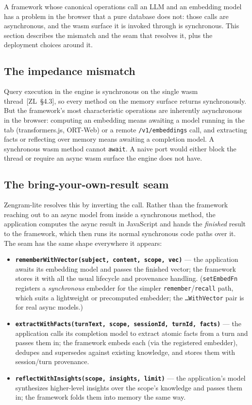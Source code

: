 \documentclass[11pt]{article}
\newcommand{\code}[1]{\texttt{#1}}
\begin{document}
A framework whose canonical operations call an LLM and an embedding model has a
problem in the browser that a pure database does not: those calls are
asynchronous, and the wasm surface it is invoked through is synchronous. This
section describes the mismatch and the seam that resolves it, plus the deployment
choices around it.

\subsection{The impedance mismatch}

Query execution in the engine is synchronous on the single wasm thread~[ZL~\S4.3],
so every method on the memory surface returns synchronously. But the framework's
most characteristic operations are inherently asynchronous in the browser:
computing an embedding means awaiting a model running in the tab (transformers.js,
ORT-Web) or a remote \code{/v1/embeddings} call, and extracting facts or
reflecting over memory means awaiting a completion model. A synchronous wasm
method cannot \code{await}. A naive port would either block the thread or require
an async wasm surface the engine does not have.

\subsection{The bring-your-own-result seam}

Zengram-lite resolves this by inverting the call. Rather than the framework
reaching out to an async model from inside a synchronous method, the application
computes the async result in JavaScript and hands the \emph{finished} result to
the framework, which then runs its normal synchronous code paths over it. The seam
has the same shape everywhere it appears:
\begin{itemize}[leftmargin=1.4em,itemsep=0.2em]
  \item \textbf{\code{rememberWithVector(subject, content, scope, vec)}} --- the
    application awaits its embedding model and passes the finished vector; the
    framework stores it with all the usual lifecycle and provenance handling.
    (\code{setEmbedFn} registers a \emph{synchronous} embedder for the simpler
    \code{remember}/\code{recall} path, which suits a lightweight or precomputed
    embedder; the \code{\ldots WithVector} pair is for real async models.)
  \item \textbf{\code{extractWithFacts(turnText, scope, sessionId, turnId,
    facts)}} --- the application calls its completion model to extract atomic facts
    from a turn and passes them in; the framework embeds each (via the registered
    embedder), dedupes and supersedes against existing knowledge, and stores them
    with session/turn provenance.
  \item \textbf{\code{reflectWithInsights(scope, insights, limit)}} --- the
    application's model synthesizes higher-level insights over the scope's
    knowledge and passes them in; the framework folds them into memory the same
    way.
\end{itemize}
\end{document}
